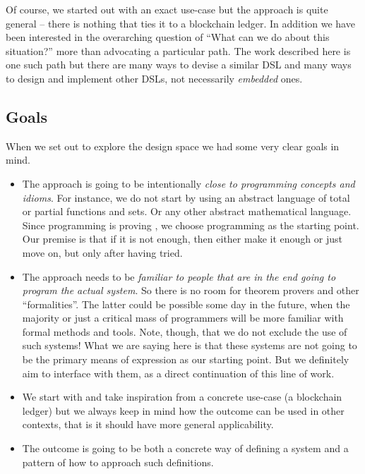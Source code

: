 \documentclass[11pt]{article}
\begin{document}
Of course, we started out with an exact use-case but the approach is quite 
general -- there is nothing that ties it to a blockchain ledger. In addition 
we have been interested in the overarching question of ``What can we do about 
this situation?'' more than advocating a particular path. The work described 
here is one such path but there are many ways to devise a similar DSL and 
many ways to design and implement other DSLs, not necessarily  
\textit{embedded} ones.

\subsection{Goals}
\label{sec:goals}
When we set out to explore the design space we had some very clear goals in 
mind.

\begin{itemize}
  \item The approach is going to be intentionally \textit{close to 
  programming concepts and idioms}. For instance, we do not start by using an 
  abstract language of total or partial functions and sets. Or any other 
  abstract mathematical language. Since programming is proving 
  \cite{site:proofs-as-programs}, we choose programming as the starting 
  point. Our premise is that if it is not enough, then either make it enough 
  or just move on, but only after having tried.
  
  \item The approach needs to be \textit{familiar to people that are in the 
  end going to program the actual system}. So there is no room for theorem 
  provers and other ``formalities''. The latter could be possible some day in 
  the future, when the majority or just a critical mass of programmers will 
  be more familiar with formal methods and tools. Note, though, that we do 
  not exclude the use of such systems! What we are saying here is that these 
  systems are not going to be the primary means of expression as our starting 
  point. But we definitely aim to interface with them, as a direct 
  continuation of this line of work.
  
  \item We start with and take inspiration from a concrete use-case (a 
  blockchain ledger) but we always keep in mind how the outcome can be used 
  in other contexts, that is it should have more general applicability.
  
  \item The outcome is going to be both a concrete way of defining a system 
  and a pattern of how to approach such definitions.
  

\end{itemize}
\end{document}
